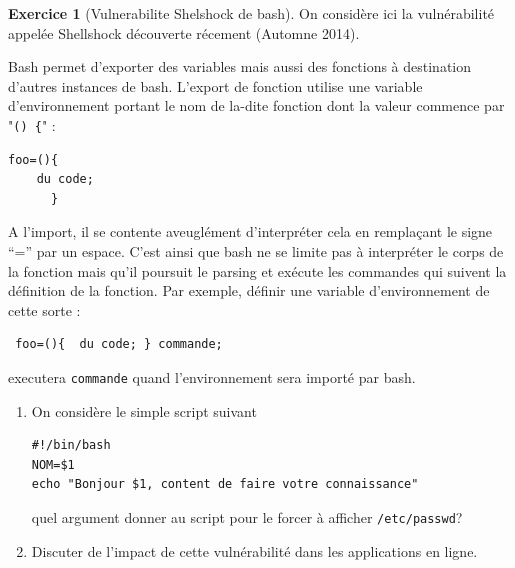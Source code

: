 \documentclass[a4paper,9pt]{article}
\theoremstyle{plain}
\theoremstyle{definition}
\newtheorem{exercice}{Exercice}
\begin{document}
\begin{exercice}[Vulnerabilite Shelshock de bash] 
On considère ici la vulnérabilité appelée Shellshock découverte récement (Automne 2014).
\bigskip

\begin{itshape}
Bash permet d'exporter des variables mais aussi des fonctions à destination d'autres instances de bash. L'export de fonction utilise une variable d'environnement portant le nom de la-dite fonction dont la valeur commence par "\texttt{() \{}" :
\begin{verbatim}
foo=(){ 
    du code; 
      }
\end{verbatim}
 
A l'import, il se contente aveuglément d'interpréter cela en remplaçant le signe ``='' par un espace. C'est ainsi que bash ne se limite pas à interpréter le corps de la fonction mais qu'il poursuit le parsing et exécute les commandes qui suivent la définition de la fonction. Par exemple, définir une variable d'environnement de cette sorte :
\begin{verbatim}
 foo=(){  du code; } commande;
\end{verbatim}
executera \texttt{commande} quand l'environnement sera importé par bash.
\end{itshape}
\vspace{0.5cm}

\begin{enumerate}
\item On considère le simple script suivant
\begin{verbatim}
#!/bin/bash
NOM=$1
echo "Bonjour $1, content de faire votre connaissance" 
\end{verbatim}
quel argument donner au script pour le forcer à afficher \texttt{/etc/passwd}?
\item Discuter de l'impact de cette vulnérabilité dans les applications en ligne.
\end{enumerate}

\end{exercice}
\end{document}
